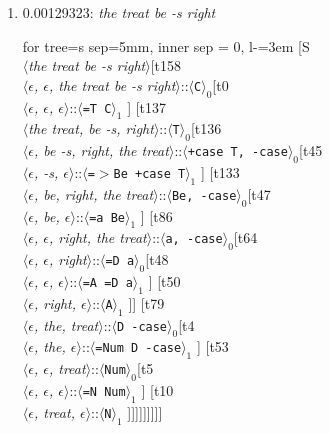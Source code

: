 \documentclass[11pt]{article}
\begin{document}
\begin{enumerate}
	\item  0.00129323: \textit{the treat be -s right} \\[0.5em]
	\begin{adjustbox}{max width = \textwidth}
	\begin{forest}
	for tree={s sep=5mm, inner sep = 0, l-=3em}
	[S\\$\langle$\textit{the treat be -s right}$\rangle$[t158\\$\langle$\textit{$\epsilon${,} $\epsilon${,} the treat be -s right}$\rangle$::$\langle$\texttt{C}$\rangle_0$[t0\\$\langle$\textit{$\epsilon${,} $\epsilon${,} $\epsilon$}$\rangle$::$\langle$\texttt{{=}T C}$\rangle_1$ ] [t137\\$\langle$\textit{the treat{,} be -s{,} right}$\rangle$::$\langle$\texttt{T}$\rangle_0$[t136\\$\langle$\textit{$\epsilon${,} be -s{,} right{,} the treat}$\rangle$::$\langle$\texttt{+case T{,} -case}$\rangle_0$[t45\\$\langle$\textit{$\epsilon${,} -s{,} $\epsilon$}$\rangle$::$\langle$\texttt{{=}$>$Be +case T}$\rangle_1$ ] [t133\\$\langle$\textit{$\epsilon${,} be{,} right{,} the treat}$\rangle$::$\langle$\texttt{Be{,} -case}$\rangle_0$[t47\\$\langle$\textit{$\epsilon${,} be{,} $\epsilon$}$\rangle$::$\langle$\texttt{{=}a Be}$\rangle_1$ ] [t86\\$\langle$\textit{$\epsilon${,} $\epsilon${,} right{,} the treat}$\rangle$::$\langle$\texttt{a{,} -case}$\rangle_0$[t64\\$\langle$\textit{$\epsilon${,} $\epsilon${,} right}$\rangle$::$\langle$\texttt{{=}D a}$\rangle_0$[t48\\$\langle$\textit{$\epsilon${,} $\epsilon${,} $\epsilon$}$\rangle$::$\langle$\texttt{{=}A {=}D a}$\rangle_1$ ] [t50\\$\langle$\textit{$\epsilon${,} right{,} $\epsilon$}$\rangle$::$\langle$\texttt{A}$\rangle_1$ ]] [t79\\$\langle$\textit{$\epsilon${,} the{,} treat}$\rangle$::$\langle$\texttt{D -case}$\rangle_0$[t4\\$\langle$\textit{$\epsilon${,} the{,} $\epsilon$}$\rangle$::$\langle$\texttt{{=}Num D -case}$\rangle_1$ ] [t53\\$\langle$\textit{$\epsilon${,} $\epsilon${,} treat}$\rangle$::$\langle$\texttt{Num}$\rangle_0$[t5\\$\langle$\textit{$\epsilon${,} $\epsilon${,} $\epsilon$}$\rangle$::$\langle$\texttt{{=}N Num}$\rangle_1$ ] [t10\\$\langle$\textit{$\epsilon${,} treat{,} $\epsilon$}$\rangle$::$\langle$\texttt{N}$\rangle_1$ ]]]]]]]]]

\end{forest}
\end{adjustbox}
\end{enumerate}
\end{document}
